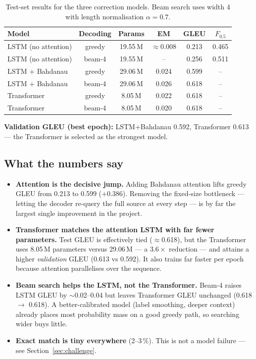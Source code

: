 \documentclass[11pt,a4paper]{article}
\begin{document}
\begin{table}[h]
\centering
\caption{Test-set results for the three correction models. Beam search uses
width 4 with length normalisation $\alpha=0.7$.}
\label{tab:main}
\begin{tabular}{l c c c c c}
\toprule
Model & Decoding & Params & EM & GLEU & $F_{0.5}$ \\
\midrule
LSTM (no attention) & greedy & 19.55\,M & $\approx$0.008 & 0.213 & 0.465 \\
LSTM (no attention) & beam-4 & 19.55\,M & --             & 0.256 & 0.511 \\
\addlinespace
LSTM + Bahdanau     & greedy & 29.06\,M & 0.024          & 0.599 & --    \\
LSTM + Bahdanau     & beam-4 & 29.06\,M & 0.026          & 0.618 & --    \\
\addlinespace
Transformer         & greedy & 8.05\,M  & 0.022          & 0.618 & --    \\
Transformer         & beam-4 & 8.05\,M  & 0.020          & 0.618 & --    \\
\bottomrule
\end{tabular}
\end{table}

\noindent\textbf{Validation GLEU (best epoch):} LSTM+Bahdanau 0.592,
Transformer 0.613 --- the Transformer is selected as the strongest model.

\subsection{What the numbers say}
\begin{itemize}[noitemsep]
  \item \textbf{Attention is the decisive jump.} Adding Bahdanau attention lifts
        greedy GLEU from 0.213 to 0.599 ($+0.386$). Removing the fixed-size
        bottleneck --- letting the decoder re-query the full source at every
        step --- is by far the largest single improvement in the project.
  \item \textbf{Transformer matches the attention LSTM with far fewer
        parameters.} Test GLEU is effectively tied ($\approx$0.618), but the
        Transformer uses 8.05\,M parameters versus 29.06\,M --- a $3.6\times$
        reduction --- and attains a higher \emph{validation} GLEU (0.613 vs
        0.592). It also trains far faster per epoch because attention
        parallelises over the sequence.
  \item \textbf{Beam search helps the LSTM, not the Transformer.} Beam-4 raises
        LSTM GLEU by $\sim$0.02--0.04 but leaves Transformer GLEU unchanged
        (0.618 $\rightarrow$ 0.618). A better-calibrated model (label smoothing,
        deeper context) already places most probability mass on a good greedy
        path, so searching wider buys little.
  \item \textbf{Exact match is tiny everywhere} (2--3\,\%). This is not a model
        failure --- see Section~\ref{sec:challenge}.
\end{itemize}
\end{document}
